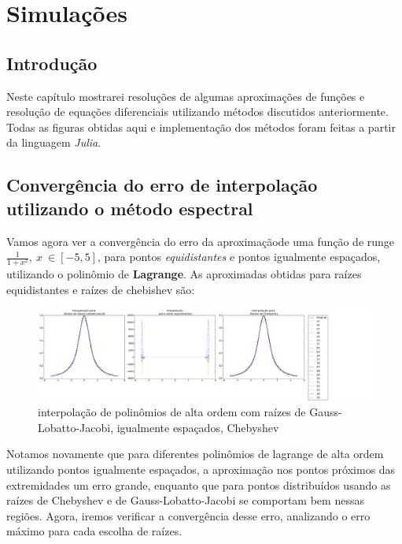  \chapter{Simulações}
\label{cap:III}
\section{Introdução}
 Neste capítulo mostrarei resoluções de algumas aproximações de funções e resolução de equações diferenciais utilizando métodos discutidos anteriormente. Todas as figuras obtidas aqui e implementação dos métodos foram feitas a partir da linguagem \emph{Julia}.

\section{Convergência do erro de interpolação utilizando o método espectral}
	Vamos agora ver a convergência do erro da aproximaçãode uma função de runge $\frac{1}{1+x^2},\ x\ \in [-5,5]$, para pontos \emph{equidistantes} e pontos igualmente espaçados, utilizando o polinômio de \textbf{Lagrange}.
	As aproximadas obtidas para raízes equidistantes e raízes de chebishev são:\\	
\begin{figure}[!ht]
  \includegraphics[width=1\textwidth,center]{figuras/interpolacao_todas.png}
  \caption{interpolação de polinômios de alta ordem com raízes de Gauss-Lobatto-Jacobi, igualmente espaçados, Chebyshev}
\end{figure}
Notamos novamente que para diferentes  polinômios de lagrange de alta ordem utilizando pontos igualmente espaçados, a aproximação nos pontos próximos das extremidades um erro  grande, enquanto que para pontos distribuídos usando as raízes de Chebyshev e de Gauss-Lobatto-Jacobi se comportam bem nessas regiões. Agora, iremos verificar a convergência desse erro, analizando o erro máximo para cada escolha de raízes.

